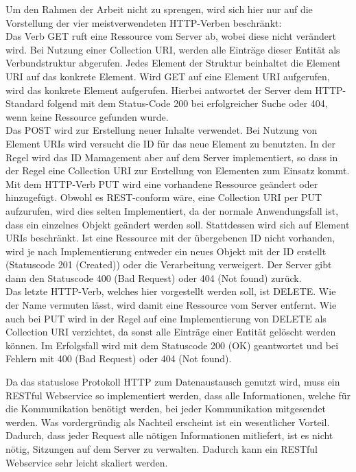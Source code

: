 Um den Rahmen der Arbeit nicht zu sprengen, wird sich hier nur auf die Vorstellung der vier meistverwendeten HTTP-Verben beschränkt:\\
Das Verb GET ruft eine Ressource vom Server ab, wobei diese nicht verändert wird. Bei Nutzung einer Collection URI, werden alle Einträge dieser Entität als Verbundstruktur abgerufen. Jedes Element der Struktur beinhaltet die Element URI auf das konkrete Element. Wird GET auf eine Element URI aufgerufen, wird das konkrete Element aufgerufen. Hierbei antwortet der Server dem HTTP-Standard folgend mit dem Status-Code 200 bei erfolgreicher Suche oder 404, wenn keine Ressource gefunden wurde.\\
Das POST wird zur Erstellung neuer Inhalte verwendet. Bei Nutzung von Element URIs wird versucht die ID für das neue Element zu benutzten. In der Regel wird das ID Mamagement aber auf dem Server implementiert, so dass in der Regel eine Collection URI zur Erstellung von Elementen zum Einsatz kommt.\\
Mit dem HTTP-Verb PUT wird eine vorhandene Ressource geändert oder hinzugefügt. Obwohl es REST-conform wäre, eine Collection URI per PUT aufzurufen, wird dies selten Implementiert, da der normale Anwendungsfall ist, dass ein einzelnes Objekt geändert werden soll. Stattdessen wird sich auf Element URIs beschränkt. Ist eine Ressource mit der übergebenen ID nicht vorhanden, wird je nach Implementierung entweder ein neues Objekt mit der ID erstellt (Statuscode 201 (Created)) oder die Verarbeitung verweigert. Der Server gibt dann den Statuscode 400 (Bad Request) oder 404 (Not found)  zurück. \\
Das letzte HTTP-Verb, welches hier vorgestellt werden soll, ist DELETE. Wie der Name vermuten lässt, wird damit eine Ressource vom Server entfernt. Wie auch bei PUT wird in der Regel auf eine Implementierung von DELETE als Collection URI verzichtet, da sonst alle Einträge einer Entität gelöscht werden können. Im Erfolgsfall wird mit dem Statuscode 200 (OK) geantwortet und bei Fehlern mit 400 (Bad Request) oder 404 (Not found).

Da das statuslose Protokoll HTTP zum Datenaustausch genutzt wird, muss ein RESTful Webservice so implementiert werden, dass alle Informationen, welche für die Kommunikation benötigt werden, bei jeder Kommunikation mitgesendet werden. Was vordergründig als Nachteil erscheint ist ein wesentlicher Vorteil. Dadurch, dass jeder Request alle nötigen Informationen mitliefert, ist es nicht nötig, Sitzungen auf dem Server zu verwalten. Dadurch kann ein RESTful Webservice sehr leicht skaliert werden.

